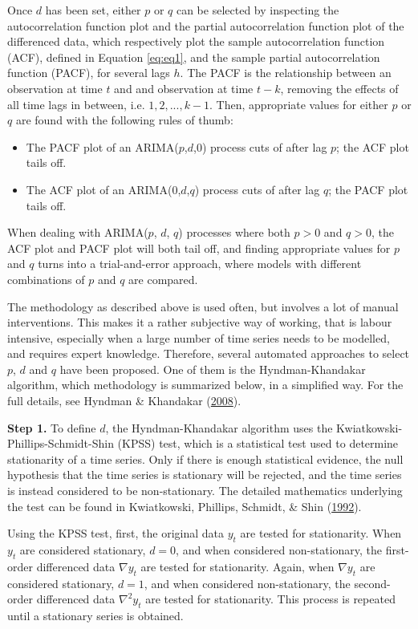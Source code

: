 \documentclass[12pt,oneside]{reedthesis}
\providecommand{\tightlist}{%
  \setlength{\itemsep}{0pt}\setlength{\parskip}{0pt}}
\begin{document}
Once \(d\) has been set, either \(p\) or \(q\) can be selected by
inspecting the autocorrelation function plot and the partial
autocorrelation function plot of the differenced data, which
respectively plot the sample autocorrelation function (ACF), defined in
Equation \eqref{eq:eq1}, and the sample partial autocorrelation function
(PACF), for several lags \(h\). The PACF is the relationship between an
observation at time \(t\) and and observation at time \(t-k\), removing
the effects of all time lags in between, i.e. \(1, 2, ..., k-1\). Then,
appropriate values for either \(p\) or \(q\) are found with the
following rules of thumb:
\begin{itemize}
\tightlist
\item
  The PACF plot of an ARIMA(\(p\),\(d\),\(0\)) process cuts of after lag
  \(p\); the ACF plot tails off.
\item
  The ACF plot of an ARIMA(\(0\),\(d\),\(q\)) process cuts of after lag
  \(q\); the PACF plot tails off.
\end{itemize}
When dealing with ARIMA(\(p\), \(d\), \(q\)) processes where both
\(p > 0\) and \(q > 0\), the ACF plot and PACF plot will both tail off,
and finding appropriate values for \(p\) and \(q\) turns into a
trial-and-error approach, where models with different combinations of
\(p\) and \(q\) are compared.

The methodology as described above is used often, but involves a lot of
manual interventions. This makes it a rather subjective way of working,
that is labour intensive, especially when a large number of time series
needs to be modelled, and requires expert knowledge. Therefore, several
automated approaches to select \(p\), \(d\) and \(q\) have been
proposed. One of them is the Hyndman-Khandakar algorithm, which
methodology is summarized below, in a simplified way. For the full
details, see Hyndman \& Khandakar
(\protect\hyperlink{ref-forecast}{2008}).

\textbf{Step 1.} To define \(d\), the Hyndman-Khandakar algorithm uses
the Kwiatkowski-Phillips-Schmidt-Shin (KPSS) test, which is a
statistical test used to determine stationarity of a time series. Only
if there is enough statistical evidence, the null hypothesis that the
time series is stationary will be rejected, and the time series is
instead considered to be non-stationary. The detailed mathematics
underlying the test can be found in Kwiatkowski, Phillips, Schmidt, \&
Shin (\protect\hyperlink{ref-kwiat1992}{1992}).

Using the KPSS test, first, the original data \(y_{t}\) are tested for
stationarity. When \(y_{t}\) are considered stationary, \(d = 0\), and
when considered non-stationary, the first-order differenced data
\(\nabla y_{t}\) are tested for stationarity. Again, when
\(\nabla y_{t}\) are considered stationary, \(d = 1\), and when
considered non-stationary, the second-order differenced data
\(\nabla^{2} y_{t}\) are tested for stationarity. This process is
repeated until a stationary series is obtained.
\end{document}
